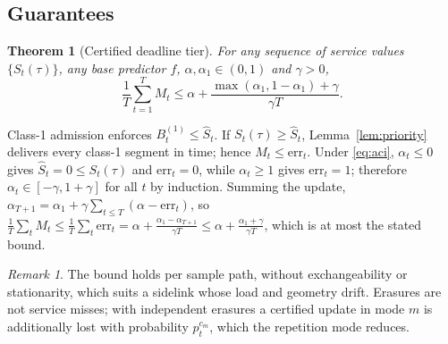 \documentclass[journal]{IEEEtran}
\newtheorem{theorem}{Theorem}
\theoremstyle{remark}
\newtheorem{remark}{Remark}
\begin{document}
\subsection{Guarantees}
\begin{theorem}[Certified deadline tier]\label{thm:cert}
For any sequence of service values $\{S_t(\tau)\}$, any base predictor $f$, $\alpha,\alpha_1\in(0,1)$ and $\gamma>0$,
\[
\frac1T\sum_{t=1}^{T}M_t\le\alpha+\frac{\max(\alpha_1,1-\alpha_1)+\gamma}{\gamma T}.
\]
\end{theorem}
\begin{IEEEproof}
Class-1 admission enforces $B^{(1)}_t\le\hat S_t$. If $S_t(\tau)\ge\hat S_t$, Lemma~\ref{lem:priority} delivers every class-1 segment in time; hence $M_t\le\mathrm{err}_t$. Under \eqref{eq:aci}, $\alpha_t\le0$ gives $\hat S_t=0\le S_t(\tau)$ and $\mathrm{err}_t=0$, while $\alpha_t\ge1$ gives $\mathrm{err}_t=1$; therefore $\alpha_t\in[-\gamma,1+\gamma]$ for all $t$ by induction. Summing the update, $\alpha_{T+1}=\alpha_1+\gamma\sum_{t\le T}(\alpha-\mathrm{err}_t)$, so $\frac1T\sum_t M_t\le\frac1T\sum_t\mathrm{err}_t=\alpha+\frac{\alpha_1-\alpha_{T+1}}{\gamma T}\le\alpha+\frac{\alpha_1+\gamma}{\gamma T}$, which is at most the stated bound.
\end{IEEEproof}
\begin{remark}
The bound holds per sample path, without exchangeability or stationarity, which suits a sidelink whose load and geometry drift. Erasures are not service misses; with independent erasures a certified update in mode $m$ is additionally lost with probability $p_t^{c_m}$, which the repetition mode reduces.
\end{remark}
\end{document}
